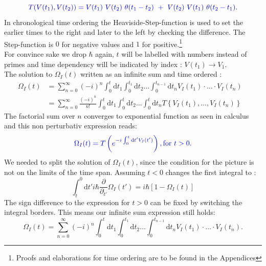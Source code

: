 \documentclass[12pt, titlepage]{article}
\begin{document}
\begin{equation}\label{eq:chron-time_ordering}
\textcolor[RGB]{0,0,204}{
T(V(t_1), V(t_2))=V(t_1)\ V(t_2)\ \theta (t_1 -t_2)\ +\ V(t_2)\  V(t_1) \ \theta (t_2-t_1)
.}
\end{equation}
In chronological time ordering the Heaviside-Step-function is used to set the earlier times to the right and later to the left by checking the difference. The Step-function is $ 0 $ for negative values and $ 1 $ for positive.\footnote{Proofs and elaborations for time ordering are to be found in the Appendices }
\\
For convince sake we drop $ \hbar $ again, $ t $ will be labelled with numbers instead of primes and time dependency will be indicated by index : $ V(t_1)\rightarrow V_{1} $.\\
The solution to $ \Omega_{I}(t) $ written as an infinite sum and time ordered :
\begin{subequations}
\begin{align}
\Omega_{I}(t) &=
\sum\limits_{n=0}^{\infty} 
(-i)^{n}
\int_{0}^{t}\mathrm{d}t_1\int_{0}^{t_{1}}\! \! \mathrm{d}t_2
 \ldots
 \int_{0}^{t_{n-1}}\! \! \mathrm{d}t_n
  V_{I}(t_1)\cdot \ldots \cdot V_{I}(t_n)
&\\
&=
\sum\limits_{n=0}^{\infty} 
\frac{(-i)^{n}}{n!}
\int_{0}^{t}\mathrm{d}t_1\int_{0}^{t}\! \! \mathrm{d}t_2
 \ldots
 \int_{0}^{t}\! \! \mathrm{d}t_n
 T\left\lbrace V_{I}(t_1), \ldots , V_{I}(t_n)\right\rbrace 
\end{align}
\end{subequations}
The factorial sum over $ n $ converges to exponential function as seen in calculus and this non perturbativ expression reads:
\begin{equation}\label{eq:Omega_I_Chron_0}
\textcolor[RGB]{0,0,204}{
\Omega_{I}(t)
=T\left( e^{-i\int_{0}^{t}\mathrm{d}t^{\prime} V_{I}(t^{\prime})} \right)
	,\text{for  }  t>0 
	.}
\end{equation}
We needed to split the solution of $ \Omega_{I}(t)
 $, since the condition for the picture is not on the limits of the time span. Assuming $ t<0 $ changes the first integral to :
 \begin{equation}
 \int_{t}^{0}\mathrm{d}t'
 i\hbar 
 \frac{\partial}{\partial_{t'}} 
 \Omega_{I} (t')
 =
 i\hbar
 \left[ 
1 -\Omega_{I}(t)
 \right] 
 \end{equation}
The sign difference to the expression for $ t>0 $ can be fixed by switching the integral borders. This means our infinite sum expression still holds:
\begin{equation}
\Omega_{I}(t) =
\sum\limits_{n=0}^{\infty} 
(-i)^{n}
\int_{0}^{t}\mathrm{d}t_1\int_{0}^{t_{1}}\! \! \mathrm{d}t_2
 \ldots
 \int_{0}^{t_{n-1}}\! \! \mathrm{d}t_n
  V_{I}(t_1)\cdot \ldots \cdot V_{I}(t_n).
\end{equation}
\end{document}
